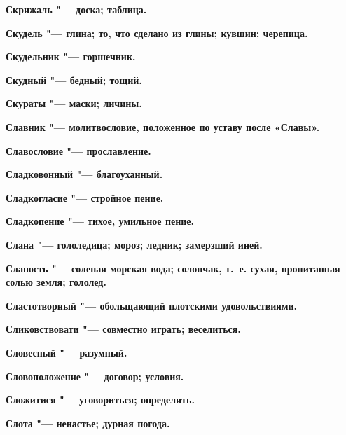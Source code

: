 \begin{mymulticols}{2}
\bfseries Скрижаль\normalfont{} "--- доска; таблица. 




\bfseries Скудель\normalfont{} "--- глина; то, что сделано из глины; кувшин; черепица. 




\bfseries Скудельник\normalfont{} "--- горшечник. 




\bfseries Скудный\normalfont{} "--- бедный; тощий. 




\bfseries Скураты\normalfont{} "--- маски; личины. 




\bfseries Славник\normalfont{} "--- молитвословие, положенное по уставу после «Славы». 




\bfseries Славословие\normalfont{} "--- прославление. 




\bfseries Сладковонный\normalfont{} "--- благоуханный. 




\bfseries Сладкогласие\normalfont{} "--- стройное пение. 




\bfseries Сладкопение\normalfont{} "--- тихое, умильное пение. 




\bfseries Слана\normalfont{} "--- гололедица; мороз; ледник; замерзший иней. 




\bfseries Сланость\normalfont{} "--- соленая морская вода; солончак, т.~е. сухая, пропитанная солью земля; гололед. 




\bfseries Сластотворный\normalfont{} "--- обольщающий плотскими удовольствиями. 




\bfseries Сликовствовати\normalfont{} "--- совместно играть; веселиться. 




\bfseries Словесный\normalfont{} "--- разумный. 




\bfseries Словоположение\normalfont{} "--- договор; условия. 




\bfseries Сложитися\normalfont{} "--- уговориться; определить. 




\bfseries Слота\normalfont{} "--- ненастье; дурная погода. 





\end{mymulticols}
